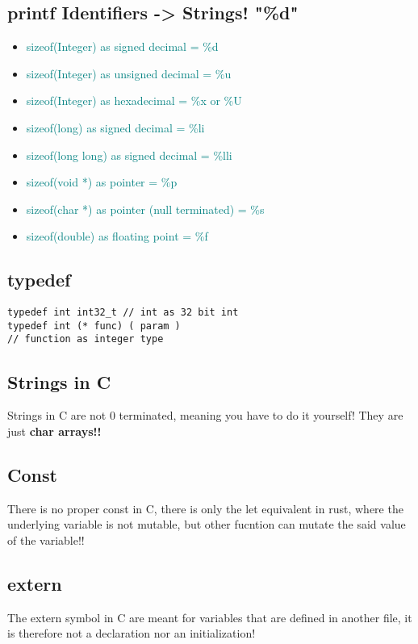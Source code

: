 \documentclass[main.tex,fontsize=8pt,paper=a4,paper=landscape,DIV=calc,]{scrartcl}
\begin{document}
\begin{multicols*}{4}
\subsection{printf Identifiers -> Strings! "\%d"}
\begin{itemize}
\item \textcolor{teal}{sizeof(Integer) as signed decimal = \%d}
\item \textcolor{teal}{sizeof(Integer) as unsigned decimal = \%u}
\item \textcolor{teal}{sizeof(Integer) as hexadecimal = \%x or \%U}
\item \textcolor{teal}{sizeof(long) as signed decimal = \%li}
\item \textcolor{teal}{sizeof(long long) as signed decimal = \%lli}
\item \textcolor{teal}{sizeof(void *) as pointer = \%p}
\item \textcolor{teal}{sizeof(char *) as pointer (null terminated) = \%s}
\item \textcolor{teal}{sizeof(double) as floating point = \%f}
\end{itemize}

\subsection{typedef}
\begin{lstlisting}
typedef int int32_t // int as 32 bit int 
typedef int (* func) ( param )
// function as integer type
\end{lstlisting}
\vspace{2mm}

\subsection{Strings in C}
Strings in C are not 0 terminated, meaning you have to do it yourself!
They are just \textbf{char arrays!!}

\subsection{Const}
There is no proper const in C, there is only the let equivalent in rust, where the underlying variable is not mutable, but other fucntion can mutate the said value of the variable!!

\subsection{extern}
The extern symbol in C are meant for variables that are defined in another file, it is therefore not a declaration nor an initialization!


\end{multicols*}
\end{document}
